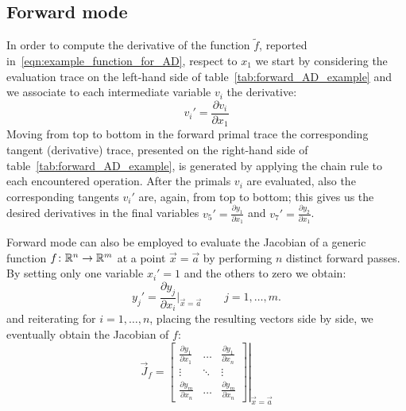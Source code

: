 


\subsection{Forward mode}

In order to compute the derivative of the function $\tilde{f}$, reported in~\eqref{eqn:example_function_for_AD}, respect to $x_1$ we start by considering the evaluation trace on the left-hand side of table~\ref{tab:forward_AD_example} and we associate to each intermediate variable $ v_i$ the derivative:
\[
	v_i' = \frac{\partial v_i}{\partial x_1}
\]
Moving from top to bottom in the forward primal trace the corresponding tangent (derivative) trace, presented on the right-hand side of table~\ref{tab:forward_AD_example}, is generated by applying the chain rule to each encountered operation. After the primals $v_i$ are evaluated, also the corresponding tangents $v_i'$ are, again, from top to bottom; this gives us the desired derivatives in the final variables $v_5' = \frac{\partial y_1}{\partial x_1}$ and $v_7' = \frac{\partial y_2}{\partial x_1}$.

\medskip
Forward mode can also be employed to evaluate the Jacobian of a generic function $f \colon \mathbb{R}^n \to \mathbb{R}^m$ at a point $\vec{x} = \vec{a}$ by performing $n$ distinct forward passes. By setting only one variable $x_i'=1$ and the others to zero we obtain:
\[
	y_j' = \frac{\partial y_j}{\partial x_i}\bigg|_{\vec{x}=\vec{a}} \qquad j=1,\dots,m.
\]
and reiterating for $ i=1,\dots,n$, placing the resulting vectors side by side, we eventually obtain the Jacobian of $f$:
\[
\vec{J}_f =
\left.
\begin{bmatrix}
	\frac{\partial y_1}{\partial x_1} &  \dots  & \frac{\partial y_1}{\partial x_n}  \\
	\vdots							  & \ddots  & \vdots							 \\
	\frac{\partial y_m}{\partial x_n} &  \dots  & \frac{\partial y_m}{\partial x_n}
\end{bmatrix}
\right|_{\vec{x} = \vec{a}}
\]

